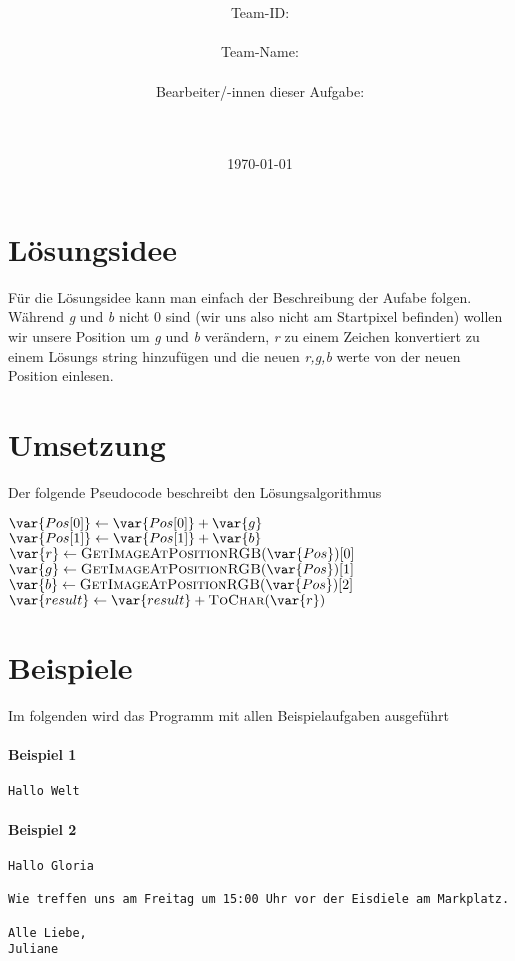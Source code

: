 \documentclass[a4paper,10pt,ngerman]{scrartcl}
\title{\textbf{\Huge\Aufgabe}}
\author{\LARGE Team-ID: \LARGE \TeamId \\\\
	    \LARGE Team-Name: \LARGE \TeamName \\\\
	    \LARGE Bearbeiter/-innen dieser Aufgabe: \\ 
	    \LARGE \Namen\\\\}
\date{\LARGE\today}
\begin{document}
\maketitle
\tableofcontents

\vspace{0.5cm}


\section{Lösungsidee}
\label{Lösungsidee}\label{sec:loesungsidee}
Für die Lösungsidee kann man einfach der Beschreibung der Aufabe folgen.
Während \emph{g} und \emph{b} nicht 0 sind (wir uns also nicht am Startpixel befinden) wollen wir unsere Position um \emph{g} und \emph{b} verändern, \emph{r} zu einem Zeichen konvertiert zu einem Lösungs string hinzufügen und die neuen \emph{r,g,b} werte von der neuen Position einlesen.

\section{Umsetzung}\label{sec:umsetzung}
Der folgende Pseudocode beschreibt den Lösungsalgorithmus
\begin{algorithmic}
  \State $\var{Pos[0]} \gets \var{Pos[0]} + \var{g}$
  \State $\var{Pos[1]} \gets \var{Pos[1]} + \var{b}$
  \State $\var{r} \gets \Call{GetImageAtPositionRGB}{\var{Pos}}[0]$
  \State $\var{g} \gets \Call{GetImageAtPositionRGB}{\var{Pos}}[1]$
  \State $\var{b} \gets \Call{GetImageAtPositionRGB}{\var{Pos}}[2]$
  \State $\var{result} \gets \var{result} + \Call{ToChar}{\var{r}}$
  \EndWhile
\end{algorithmic}

\clearpage
\section{Beispiele}
Im folgenden wird das Programm mit allen Beispielaufgaben ausgeführt
\paragraph{Beispiel 1}\mbox{}
\begin{lstlisting}[frame=tb]
Hallo Welt
\end{lstlisting}
\paragraph{Beispiel 2}\mbox{}
\begin{lstlisting}[frame=tb]
Hallo Gloria

Wie treffen uns am Freitag um 15:00 Uhr vor der Eisdiele am Markplatz.

Alle Liebe,
Juliane
\end{lstlisting}
\end{document}
